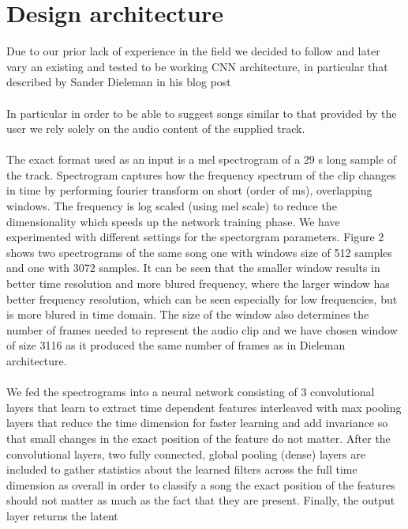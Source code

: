 \documentclass[11pt, a4paper]{article}
\begin{document}
  \section{Design architecture}
    Due to our prior lack of experience in the field we decided to follow
    and later vary an existing and tested to be working CNN architecture, in
    particular that described by Sander Dieleman in his blog post
    \cite{spotify-dieleman}
    \\ \\
    \noindent    
    In particular in order to be able to suggest songs similar to that provided
    by the user we rely solely on the audio content of the supplied track.
    \\ \\
    \noindent
    The exact format used as an input is a mel spectrogram of a 29 s long sample
    of the track. Spectrogram captures how the frequency spectrum of the clip
    changes in time by performing fourier transform on short (order of ms),
    overlapping windows. The frequency is log scaled (using mel scale) to reduce
    the dimensionality which speeds up the network training phase. We have
    experimented with different settings for the spectorgram parameters. Figure
    2 shows two spectrograms of the same song one with windows size of 512
    samples and one with 3072 samples. It can be seen that the smaller window
    results in better time resolution and more blured frequency, where the
    larger window has better frequency resolution, which can be seen especially
    for low frequencies, but is more blured in time domain. The size of the
    window also determines the number of frames needed to represent the audio
    clip and we have chosen window of size 3116 as it produced the same number
    of frames as in Dieleman architecture.
    \\ \\
    \noindent
    We fed the spectrograms into a neural network consisting of 3 convolutional
    layers that learn to extract time dependent features interleaved with
    max pooling layers that reduce the time dimension for faster learning and
    add invariance so that small changes in the exact position of the feature
    do not matter. After the convolutional layers, two fully connected, global
    pooling (dense) layers are included to gather statistics about the learned
    filters across the full time dimension as overall in order to classify a
    song the exact position of the features should not matter as much as the
    fact that they are present. Finally, the output layer returns the latent
\end{document}
